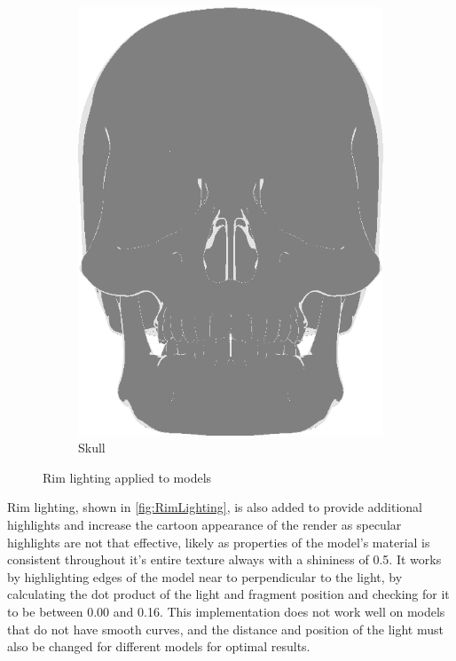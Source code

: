 \begin{figure}[h]
\begin{subfigure}[b]{0.22\textwidth}
    \includegraphics[width=\textwidth]{img/Lighting/RimSkull.png}
    \caption{Skull}
    \label{fig:RimSkull}
\end{subfigure}
\caption{Rim lighting applied to models}
\label{fig:RimLighting}
\end{figure}

Rim lighting, shown in \autoref{fig:RimLighting}, is also added to provide additional highlights and increase the cartoon appearance 
of the render as specular highlights are not that effective, likely as properties of the model's 
material is consistent throughout it's entire texture always with a shininess of 0.5. It works by 
highlighting edges of the model near to perpendicular to the light, by calculating the dot product 
of the light and fragment position and checking for it to be between 0.00 and 0.16. This implementation 
does not work well on  models that do not have smooth curves, and the distance and position of the 
light must also be changed for different models for optimal results. 

